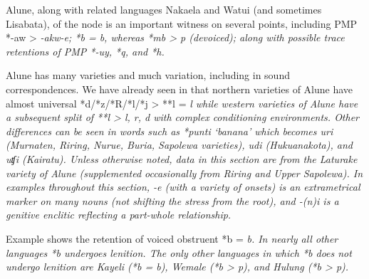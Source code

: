 Alune,
along with related languages Naka{\Q}ela
and Watui (and sometimes Lisabata),
of the  node is an important witness on
several points, including PMP *-aw > \it{-akw-e}; *b = \it{b},
whereas *mb > \it{p} (devoiced); along with possible trace retentions
of PMP *-uy, *q, and *h.

Alune has many varieties
and much variation, including in sound correspondences.
We have already seen in  that northern varieties of
Alune have almost universal *d/*z/*R/*l/*j > **l = \it{l} while
western varieties of Alune have a subsequent split of **l > \it{l,
r, d} with complex conditioning environments.
Other differences can be seen in words such as *punti ‘banana’
which becomes \it{uri} (Murnaten,
Riring, Nurue, Buria, Sapolewa varieties), \it{udi} (Hukuanakota), and \it{uʧi} (Kairatu).
Unless otherwise noted, data in this section are from the Laturake
variety of Alune (supplemented occasionally from Riring and Upper Sapolewa).
In examples throughout this section,
\it{-e} (with a variety of onsets) is an extrametrical marker
on many nouns  (not shifting the stress from the root),
and \it{-(n)i} is a genitive enclitic reflecting a part-whole relationship.

Example  shows the retention of voiced obstruent *b = \it{b}.
In nearly all other  languages *b undergoes lenition.
The only other languages in which *b does not undergo lenition
are Kayeli (*b = \it{b}),
Wemale (*b > \it{p}),
and Hulung (*b > \it{p}).

